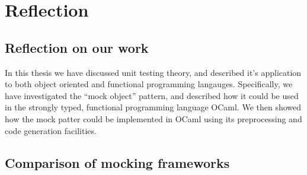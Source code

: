 \chapter{Reflection}
\label{reflection}

\section{Reflection on our work}


In this thesis we have discussed unit testing theory, and described
it's application to both object oriented and functional programming
langauges. Specifically, we have investigated the ``mock object''
pattern, and described how it could be used in the strongly typed,
functional programming language OCaml. We then showed how the mock
patter could be implemented in OCaml using its preprocessing and code
generation facilities.

\section{Comparison of mocking frameworks}
\label{application:comparison}



